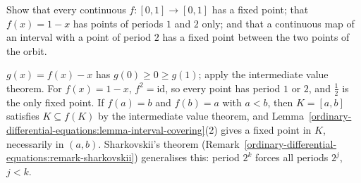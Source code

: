 \begin{exercise}\label{ordinary-differential-equations:exercise-periods-interval}
Show that every continuous $f \colon [0, 1] \to [0, 1]$ has a fixed point; that $f(x) = 1 - x$ has points of periods $1$ and $2$ only; and that a continuous map of an interval with a point of period $2$ has a fixed point between the two points
of the orbit.
\end{exercise}

\begin{solution}
$g(x) = f(x) - x$ has $g(0) \geq 0 \geq g(1)$; apply the intermediate value theorem. For $f(x) = 1 - x$, $f^2 = \mathrm{id}$, so every point has period $1$ or $2$, and $\frac12$ is the only fixed point. If $f(a) = b$ and $f(b) = a$ with $a < b$, then $K = [a, b]$ satisfies $K \subseteq f(K)$ by the intermediate value theorem, and
Lemma~\ref{ordinary-differential-equations:lemma-interval-covering}(2) gives a fixed point in $K$, necessarily in $(a, b)$. Sharkovskii's theorem (Remark~\ref{ordinary-differential-equations:remark-sharkovskii}) generalises this: period
$2^k$ forces all periods $2^j$, $j < k$.
\end{solution}
